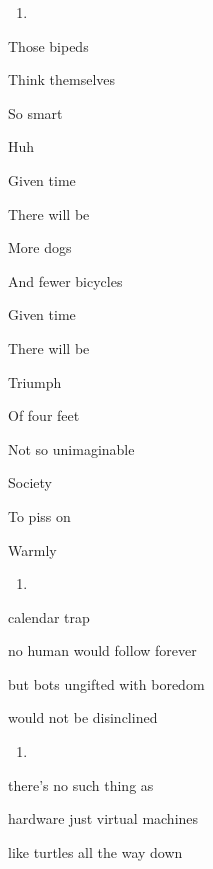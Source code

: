 
\begin{enumerate}
\def\labelenumi{\arabic{enumi}.}
\item
\end{enumerate}

Those bipeds

Think themselves

So smart

Huh

Given time

There will be

More dogs

And fewer bicycles

Given time

There will be

Triumph

Of four feet

Not so unimaginable

Society

To piss on

Warmly

\begin{enumerate}
\def\labelenumi{\arabic{enumi}.}
\setcounter{enumi}{1}
\item
\end{enumerate}

calendar trap

no human would follow forever

but bots ungifted with boredom

would not be disinclined

\begin{enumerate}
\def\labelenumi{\arabic{enumi}.}
\setcounter{enumi}{2}
\item
\end{enumerate}

there's no such thing as

hardware just virtual machines

like turtles all the way down
